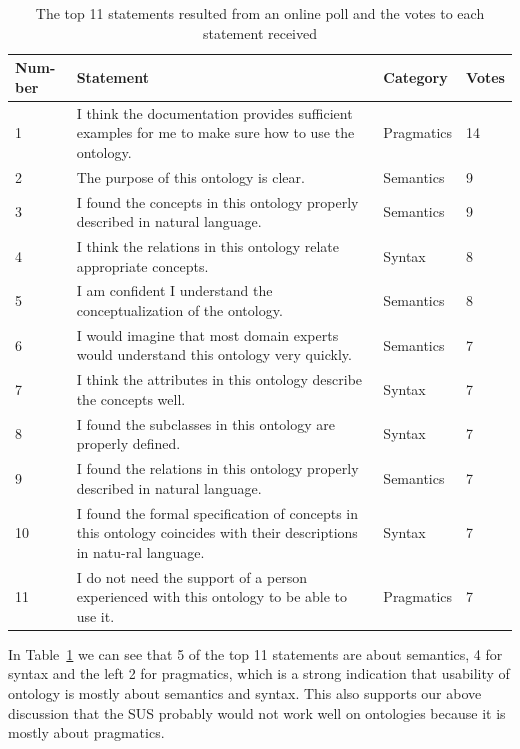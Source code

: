 \begin{table}
	\centering
	\caption{The top 11 statements resulted from an online poll and the votes to each statement received}
	\label{tab:poll}
	\begin{tabular}{|p{}|p{}|p{}|p{}|}
		\hline Num-ber & Statement & Category & Votes \\ 
		\hline 1 & I think the documentation provides sufficient examples for me to make sure how to use the ontology. & Pragmatics & 14 \\ 
		\hline 2 & The purpose of this ontology is clear. & Semantics & 9 \\ 
		\hline 3 & I found the concepts in this ontology properly described in natural language. & Semantics & 9 \\ 
		\hline 4 & I think the relations in this ontology relate appropriate concepts. & Syntax & 8 \\ 
		\hline 5 & I am confident I understand the conceptualization of the ontology. & Semantics & 8 \\ 
		\hline 6 & I would imagine that most domain experts would understand this ontology very quickly. & Semantics & 7 \\ 
		\hline 7 & I think the attributes in this ontology describe the concepts well. & Syntax & 7 \\ 
		\hline 8 & I found the subclasses in this ontology are properly defined. & Syntax & 7 \\ 
		\hline 9 & I found the relations in this ontology properly described in natural language. & Semantics & 7 \\ 
		\hline 10 & I found the formal specification of concepts in this ontology coincides with their descriptions in natu-ral language. & Syntax & 7 \\ 
		\hline 11 & I do not need the support of a person experienced with this ontology to be able to use it. & Pragmatics & 7 \\ 
		\hline 
	\end{tabular} 
\end{table}
In Table~\ref{tab:poll} we can see that 5 of the top 11 statements are about semantics, 4 for syntax and the left 2 for pragmatics, which is a strong indication that usability of ontology is mostly about semantics and syntax. This also supports our above discussion that the SUS probably would not work well on ontologies because it is mostly about pragmatics.

